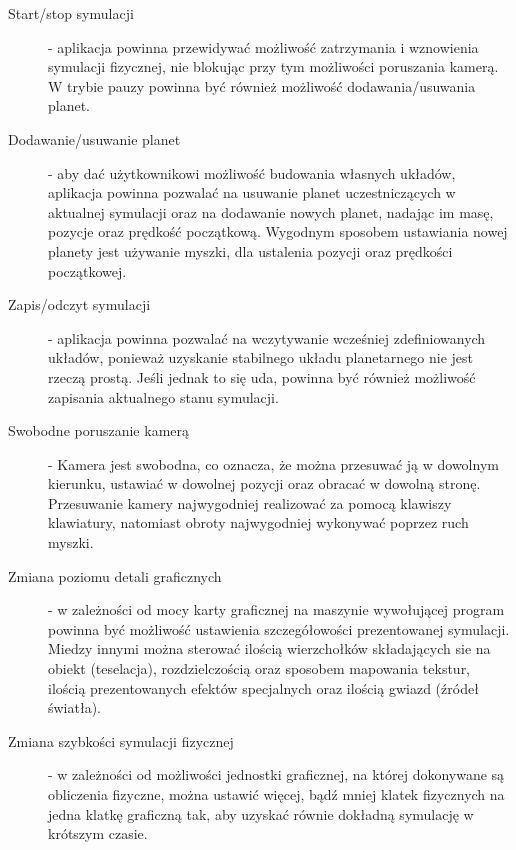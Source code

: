 \begin{description}
	\item[Start/stop symulacji] - aplikacja powinna przewidywać możliwość zatrzymania i wznowienia symulacji fizycznej, nie blokując przy tym możliwości poruszania kamerą. W trybie pauzy powinna być również możliwość dodawania/usuwania planet.
	\item[Dodawanie/usuwanie planet] - aby dać użytkownikowi możliwość budowania własnych układów, aplikacja powinna pozwalać na usuwanie planet uczestniczących w aktualnej symulacji oraz na dodawanie nowych planet, nadając im masę, pozycje oraz prędkość początkową. Wygodnym sposobem ustawiania nowej planety jest używanie myszki, dla ustalenia pozycji oraz prędkości początkowej.
	\item[Zapis/odczyt symulacji] - aplikacja powinna pozwalać na wczytywanie wcześniej zdefiniowanych układów, ponieważ uzyskanie stabilnego układu planetarnego nie jest rzeczą prostą. Jeśli jednak to się uda, powinna być również możliwość zapisania aktualnego stanu symulacji.
	\item[Swobodne poruszanie kamerą] - Kamera jest swobodna, co oznacza, że można przesuwać ją w dowolnym kierunku, ustawiać w dowolnej pozycji oraz obracać w dowolną stronę. Przesuwanie kamery najwygodniej realizować za pomocą klawiszy klawiatury, natomiast obroty najwygodniej wykonywać poprzez ruch myszki.
	\item[Zmiana poziomu detali graficznych] - w zależności od mocy karty graficznej na maszynie wywołującej program powinna być możliwość ustawienia szczegółowości prezentowanej symulacji. Miedzy innymi można sterować ilością wierzchołków składających sie na obiekt (teselacja), rozdzielczością oraz sposobem mapowania tekstur, ilością prezentowanych efektów specjalnych oraz ilością gwiazd (źródeł światła).
	\item[Zmiana szybkości symulacji fizycznej] - w zależności od możliwości jednostki graficznej, na której dokonywane są obliczenia fizyczne, można ustawić więcej, bądź mniej klatek fizycznych na jedna klatkę graficzną tak, aby uzyskać równie dokładną symulację w krótszym czasie.
\end{description}

